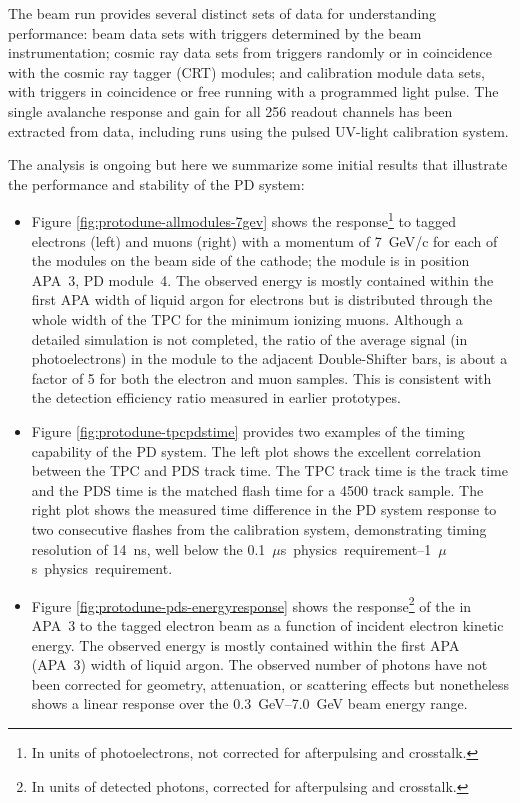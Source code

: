 The  beam run provides several distinct sets of data for understanding  performance: beam data sets with triggers determined by the beam instrumentation; cosmic ray data sets from triggers randomly or in coincidence with the cosmic ray tagger (CRT) modules; and calibration module data sets, with triggers in coincidence or free running with a programmed light pulse. 
The single avalanche response and gain for all \num{256} 
readout channels has been extracted from  data, including runs using the pulsed UV-light calibration system.

The analysis is ongoing but here we summarize some initial results that illustrate the performance and stability of the PD system:

\begin{itemize}
   \item Figure \ref{fig:protodune-allmodules-7gev} shows the response\footnote{In units of photoelectrons, not corrected for  afterpulsing and crosstalk.} to tagged electrons (left) and muons (right) with a momentum of \SI{7}{GeV/c} for each of the  modules on the beam side of the cathode; the  module is in position APA~3, PD module~4. The observed energy is mostly contained within the first APA width of liquid argon for electrons but is distributed through the whole width of the TPC for the minimum ionizing muons. Although a detailed simulation is not completed, the ratio of the average signal (in photoelectrons) in the  module to the adjacent Double-Shifter bars, is about a factor of 5 for both the electron and muon samples. This is consistent with the detection efficiency ratio measured in earlier prototypes.
   

    \item Figure \ref{fig:protodune-tpcpdstime} provides two examples of the timing capability of the PD system. The left plot shows the excellent correlation between the TPC and PDS track time. 
    The TPC track time is the track \tzero time and the PDS time is the matched flash time for a 4500 track sample. The right plot shows the measured time difference in the PD system response to two consecutive flashes from the calibration system, demonstrating timing resolution of \SI{14}{ns}, well below the \SIrange{0.1}{1}{$\mu$s} physics requirement.
 
    \item Figure \ref{fig:protodune-pds-energyresponse} shows the response\footnote{In units of detected photons, corrected for  afterpulsing and crosstalk.} of the  in APA~3 to the tagged electron beam as a function of incident electron kinetic energy. 
    The observed energy is mostly contained within the first APA (APA~3) width of liquid argon. The observed number of photons have not been corrected for geometry, attenuation, or scattering effects but nonetheless shows a linear response over the \SIrange{0.3}{7.0}{GeV} beam energy range.   
    

\end{itemize}
